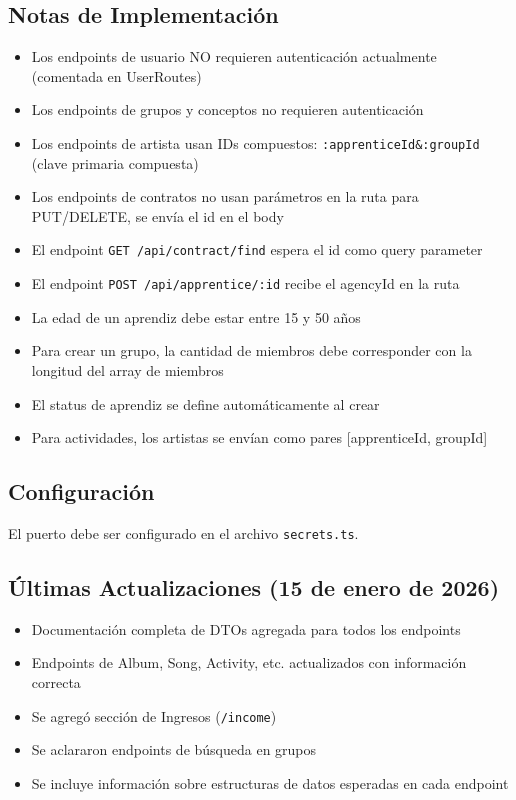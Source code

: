 \documentclass[11pt]{article}
\begin{document}
\subsection*{Notas de Implementación}
\begin{itemize}
    \item Los endpoints de usuario NO requieren autenticación actualmente (comentada en UserRoutes)
    \item Los endpoints de grupos y conceptos no requieren autenticación
    \item Los endpoints de artista usan IDs compuestos: \texttt{:apprenticeId\&:groupId} (clave primaria compuesta)
    \item Los endpoints de contratos no usan parámetros en la ruta para PUT/DELETE, se envía el id en el body
    \item El endpoint \texttt{GET /api/contract/find} espera el id como query parameter
    \item El endpoint \texttt{POST /api/apprentice/:id} recibe el agencyId en la ruta
    \item La edad de un aprendiz debe estar entre 15 y 50 años
    \item Para crear un grupo, la cantidad de miembros debe corresponder con la longitud del array de miembros
    \item El status de aprendiz se define automáticamente al crear
    \item Para actividades, los artistas se envían como pares [apprenticeId, groupId]
\end{itemize}

\subsection*{Configuración}
El puerto debe ser configurado en el archivo \texttt{secrets.ts}.

\subsection*{Últimas Actualizaciones (15 de enero de 2026)}
\begin{itemize}
    \item Documentación completa de DTOs agregada para todos los endpoints
    \item Endpoints de Album, Song, Activity, etc. actualizados con información correcta
    \item Se agregó sección de Ingresos (\texttt{/income})
    \item Se aclararon endpoints de búsqueda en grupos
    \item Se incluye información sobre estructuras de datos esperadas en cada endpoint
\end{itemize}
\end{document}
